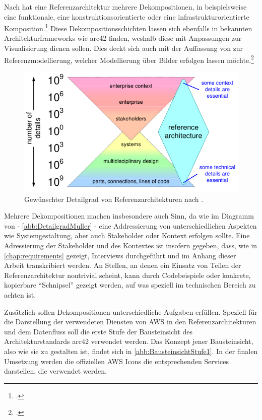 Nach \citeauthor{Muller.2020} hat eine Referenzarchitektur mehrere Dekompositionen, in beispielsweise eine funktionale, eine konstruktionsorientierte oder eine infrastrukturorientierte Komposition.\footcite[Vgl.][7]{Muller.2020} Diese Dekompositionsschichten lassen sich ebenfalls in bekannten Architekturframeworks wie arc42 finden, weshalb diese mit Anpassungen zur Visualisierung dienen sollen. Dies deckt sich auch mit der Auffassung von \citeauthor{Schutte.1998} zur Referenzmodellierung, welcher Modellierung über Bilder erfolgen lassen möchte.\footcite[Vgl.][185]{Schutte.1998}

\begin{figure}[H]
\centering
\includegraphics[height=0.23\textheight]{graphics/reference-architecture-details.pdf}
\caption[Gewünschter Detailgrad von Referenzarchitekturen nach \citeauthor{Muller.2020}]{Gewünschter Detailgrad von Referenzarchitekturen nach \citeauthor{Muller.2020}.\footnotemark}
\label{abb:DetailgradMuller}
\end{figure}

Mehrere Dekompositionen machen insbesondere auch Sinn, da wie im Diagramm von \citeauthor{Muller.2020} - \autoref{abb:DetailgradMuller} - eine Addressierung von unterschiedlichen Aspekten wie Systemgestaltung, aber auch Stakeholder oder Kontext erfolgen sollte. Eine Adressierung der Stakeholder und des Kontextes ist insofern gegeben, dass, wie in \autoref{chap:requirements} gezeigt, Interviews durchgeführt und im Anhang dieser Arbeit transkribiert werden. An Stellen, an denen ein Einsatz von Teilen der Referenzarchitektur nontrivial scheint, kann durch Codebeispiele oder konkrete, kopierbare \enquote{Schnipsel} gezeigt werden, auf was speziell im technischen Bereich zu achten ist.

Zusätzlich sollen Dekompositionen unterschiedliche Aufgaben erfüllen. Speziell für die Darstellung der verwendeten Diensten von \ac{AWS} in den Referenzarchitekturen und dem Datenfluss soll die erste Stufe der Bausteinsicht des Architekturstandards arc42 verwendet werden. Das Konzept jener Bausteinsicht, also wie sie zu gestalten ist, findet sich in \autoref{abb:BausteinsichtStufe1}. In der finalen Umsetzung werden die offiziellen \ac{AWS} Icons die entsprechenden Services darstellen, die verwendet werden.

